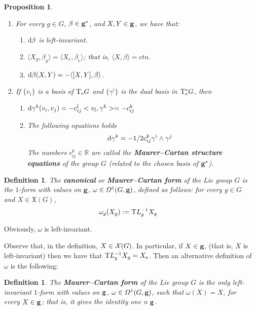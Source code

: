 \documentclass[12pt]{report}
\newtheorem{prop}[teor]{Proposition}
\newtheorem{definition}[teor]{Definition}
\def\vf{\mathfrak X}
\def\d{{\rm d}}
\def\Real{\mathbb{R}}
\def\Tan{{\rm T}}
\begin{document}
\begin{appendix}
\begin{prop}
\label{A30}
\begin{enumerate}
\item
For every $g \in G$, $\beta \in {\bf g}^*$,
and $X,Y \in {\bf g}$, we have that:
\begin{enumerate}
\item
$\d \beta$ is left-invariant.
\item
$\langle X_g,\beta_g\rangle = \langle X_e,\beta_e\rangle$;
that is,
$\langle X,\beta\rangle = ctn.$
\item
$\d \beta (X,Y) = -\langle[X,Y],\beta\rangle$.
\end{enumerate}
\item
If $\{ v_i \}$ is a basis of $\Tan_eG$ and
$\{ \gamma^i \}$ is the dual basis in $\Tan_e^*G$, then
\begin{enumerate}
\item
$\d \gamma^k (v_i,v_j) = -c_{ij}^l<v_l,\gamma^k> = - c_{ij}^k$
\item
The following equations holds
$$
\d \gamma^k = -1/2 c^k_{ij}\gamma^i \wedge \gamma^j
$$
The numbers $c^k_{ij}\in\Real$ are called the
\textbf{Maurer--Cartan structure equations}
of the group $G$ (related to the chosen basis of ${\bf g}^*$).
\end{enumerate}
\end{enumerate}
\end{prop}

\begin{definition}
The \textbf{canonical} or  \textbf{Maurer--Cartan form}
of the Lie group $G$ is the $1$-form with values on ${\bf g}$,
$\omega \in {\mit\Omega}^1(G,{\bf g})$,
defined as follows: 
for every $g \in G$ and $X \in\vf(G)$,
$$
\omega_g(X_g) := \Tan L_g^{-1}X_g
$$
\end{definition}

Obviously, $\omega$ is left-invariant.

Observe that, in the definition, $X \in {\cal X}(G)$.
In particular, if $X \in {\bf g}$, 
(that is, $X$ is left-invariant) then we have that
$\Tan L_g^{-1}X_g = X_e$.
Then an alternative definition of $\omega$ is the following:

\begin{definition}
The \textbf{Maurer--Cartan form}
of the Lie group $G$ is the only left-invariant $1$-form
with values on ${\bf g}$,
$\omega \in {\mit\Omega}^1(G,{\bf g})$,
such that $\omega(X) = X$, for every $X \in {\bf g}$;
that is, it gives the identity one n ${\bf g}$.
\end{definition}


\end{appendix}
\end{document}
